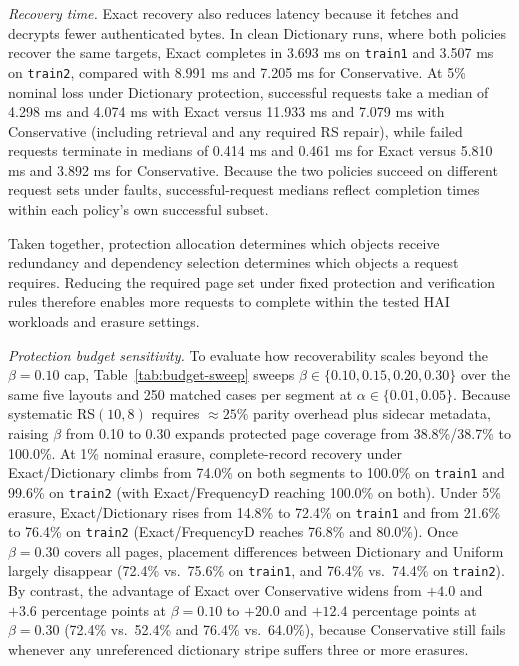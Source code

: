 \documentclass[10pt,journal]{IEEEtran}
\begin{document}
\emph{Recovery time.}
Exact recovery also reduces latency because it fetches and decrypts fewer authenticated bytes. In clean Dictionary runs, where both policies recover the same targets, Exact completes in 3.693 ms on \texttt{train1} and 3.507 ms on \texttt{train2}, compared with 8.991 ms and 7.205 ms for Conservative. At 5\% nominal loss under Dictionary protection, successful requests take a median of 4.298 ms and 4.074 ms with Exact versus 11.933 ms and 7.079 ms with Conservative (including retrieval and any required RS repair), while failed requests terminate in medians of 0.414 ms and 0.461 ms for Exact versus 5.810 ms and 3.892 ms for Conservative. Because the two policies succeed on different request sets under faults, successful-request medians reflect completion times within each policy's own successful subset.

Taken together, protection allocation determines which objects receive redundancy and dependency selection determines which objects a request requires. Reducing the required page set under fixed protection and verification rules therefore enables more requests to complete within the tested HAI workloads and erasure settings.

\emph{Protection budget sensitivity.}
To evaluate how recoverability scales beyond the $\beta=0.10$ cap, Table~\ref{tab:budget-sweep} sweeps $\beta\in\{0.10,0.15,0.20,0.30\}$ over the same five layouts and 250 matched cases per segment at $\alpha\in\{0.01,0.05\}$. Because systematic RS$(10,8)$ requires $\approx 25\%$ parity overhead plus sidecar metadata, raising $\beta$ from 0.10 to 0.30 expands protected page coverage from 38.8\%/38.7\% to 100.0\%. At 1\% nominal erasure, complete-record recovery under Exact/Dictionary climbs from 74.0\% on both segments to 100.0\% on \texttt{train1} and 99.6\% on \texttt{train2} (with Exact/FrequencyD reaching 100.0\% on both). Under 5\% erasure, Exact/Dictionary rises from 14.8\% to 72.4\% on \texttt{train1} and from 21.6\% to 76.4\% on \texttt{train2} (Exact/FrequencyD reaches 76.8\% and 80.0\%). Once $\beta=0.30$ covers all pages, placement differences between Dictionary and Uniform largely disappear (72.4\% vs.\ 75.6\% on \texttt{train1}, and 76.4\% vs.\ 74.4\% on \texttt{train2}). By contrast, the advantage of Exact over Conservative widens from $+4.0$ and $+3.6$ percentage points at $\beta=0.10$ to $+20.0$ and $+12.4$ percentage points at $\beta=0.30$ (72.4\% vs.\ 52.4\% and 76.4\% vs.\ 64.0\%), because Conservative still fails whenever any unreferenced dictionary stripe suffers three or more erasures.
\end{document}

